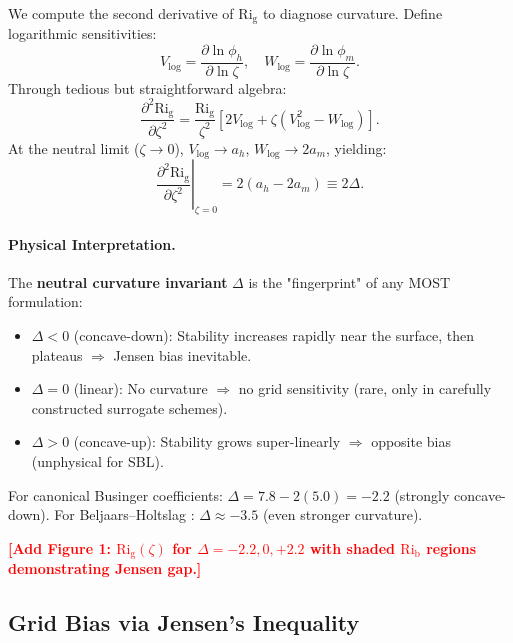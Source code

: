 \documentclass[twocolumn,11pt]{article}
\newcommand{\Rig}{\text{Ri}_{\text{g}}}
\newcommand{\Rib}{\text{Ri}_{\text{b}}}
\newcommand{\TODO}[1]{\textcolor{red}{\textbf{[#1]}}}
\begin{document}
We compute the second derivative of $\Rig$ to diagnose curvature. Define logarithmic sensitivities:
\begin{equation}
V_{\log} = \frac{\partial \ln \phi_h}{\partial \ln \zeta}, \quad W_{\log} = \frac{\partial \ln \phi_m}{\partial \ln \zeta}.
\end{equation}
Through tedious but straightforward algebra:
\begin{equation}
\frac{\partial^2 \Rig}{\partial \zeta^2} = \frac{\Rig}{\zeta^2}\left[2V_{\log} + \zeta(V_{\log}^2 - W_{\log})\right].
\label{eq:curvature_general}
\end{equation}
At the neutral limit ($\zeta \to 0$), $V_{\log} \to a_h$, $W_{\log} \to 2a_m$, yielding:
\begin{equation}
\left.\frac{\partial^2 \Rig}{\partial \zeta^2}\right|_{\zeta=0} = 2(a_h - 2a_m) \equiv \boxed{2\Delta}.
\label{eq:neutral_invariant}
\end{equation}

\paragraph{Physical Interpretation.} The \textbf{neutral curvature invariant} $\Delta$ is the "fingerprint" of any MOST formulation:
\begin{itemize}
\item $\Delta < 0$ (concave-down): Stability increases rapidly near the surface, then plateaus $\Rightarrow$ Jensen bias inevitable.
\item $\Delta = 0$ (linear): No curvature $\Rightarrow$ no grid sensitivity (rare, only in carefully constructed surrogate schemes).
\item $\Delta > 0$ (concave-up): Stability grows super-linearly $\Rightarrow$ opposite bias (unphysical for SBL).
\end{itemize}

\noindent For canonical Businger coefficients: $\Delta = 7.8 - 2(5.0) = \boxed{-2.2}$ (strongly concave-down). For Beljaars--Holtslag \citep{beljaars1991}: $\Delta \approx -3.5$ (even stronger curvature).

\TODO{Add Figure 1: $\Rig(\zeta)$ for $\Delta = -2.2, 0, +2.2$ with shaded $\Rib$ regions demonstrating Jensen gap.}

\subsection{Grid Bias via Jensen's Inequality}
\end{document}
